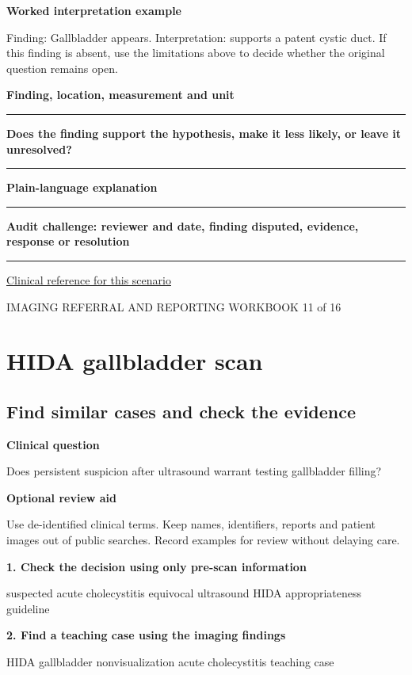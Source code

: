 \documentclass[11pt,a4paper]{article}
\newcommand{\record}[1]{\textbf{#1}\par\vspace{0.55\baselineskip}\hrule\vspace{0.35\baselineskip}}
\begin{document}
\textbf{Worked interpretation example}\par Finding: Gallbladder appears. Interpretation: supports a patent cystic duct. If this finding is absent, use the limitations above to decide whether the original question remains open.\par

\record{Finding, location, measurement and unit}

\record{Does the finding support the hypothesis, make it less likely, or leave it unresolved?}

\record{Plain-language explanation}

\record{Audit challenge: reviewer and date, finding disputed, evidence, response or resolution}

\small\href{https://www.radiologyinfo.org/en/info/acs-right-upper-quadrant-pain}{Clinical reference for this scenario}

\normalsize

\newpage

{\small IMAGING REFERRAL AND REPORTING WORKBOOK \hfill 11 of 16}

\section*{HIDA gallbladder scan}

\subsection*{Find similar cases and check the evidence}

\textbf{Clinical question}\par Does persistent suspicion after ultrasound warrant testing gallbladder filling?\par

\textbf{Optional review aid}\par Use de-identified clinical terms. Keep names, identifiers, reports and patient images out of public searches. Record examples for review without delaying care.\par

\textbf{1. Check the decision using only pre-scan information}\par suspected acute cholecystitis equivocal ultrasound HIDA appropriateness guideline\par

\textbf{2. Find a teaching case using the imaging findings}\par HIDA gallbladder nonvisualization acute cholecystitis teaching case\par
\end{document}
